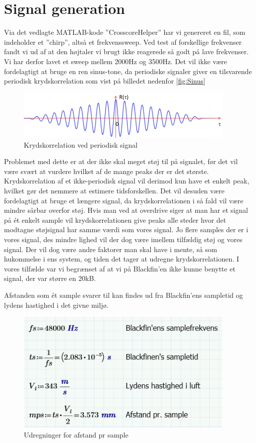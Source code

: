\graphicspath{{Chapters/Opgave1/}}

\chapter{Signal generation}
Via det vedlagte MATLAB-kode ”CrosscoreHelper” har vi genereret en fil, som indeholder et ”chirp”, altså et frekvenssweep. Ved test af forskellige frekvenser fandt vi ud af at den højtaler vi brugt ikke reagerede så godt på lave frekvenser. Vi har derfor lavet et sweep mellem 2000Hz og 3500Hz.
Det vil ikke være fordelagtigt at bruge en ren sinus-tone, da periodiske signaler giver en tilsvarende periodisk krydskorrelation som vist på billedet nedenfor \autoref{fig:Sinus}

\begin{figure}[H]
\centering
\includegraphics[width = 300pt]{Img/Sinus.PNG}
\caption{Krydskorrelation ved periodisk signal}
\label{fig:Sinus}
\end{figure}

Problemet med dette er at der ikke skal meget støj til på signalet, før det vil være svært at vurdere hvilket af de mange peaks der er det største. Krydskorrelation af et ikke-periodisk signal vil derimod kun have et enkelt peak, hvilket gør det nemmere at estimere tidsforskellen.
Det vil desuden være fordelagtigt at bruge et længere signal, da krydskorrelationen i så fald vil være mindre sårbar overfor støj. Hvis man ved at overdrive siger at man har et signal på ét enkelt sample vil krydskorrelationen give peaks alle steder hvor det modtagne støjsignal har samme værdi som vores signal. Jo flere samples der er i vores signal, des mindre lighed vil der dog være imellem tilfældig støj og vores signal. Der vil dog være andre faktorer man skal have i mente, så som hukommelse i ens system, og tiden det tager at udregne krydskorrelationen. I vores tilfælde var vi begrænset af at vi på Blackfin’en ikke kunne benytte et signal, der var større en 20kB.

Afstanden som ét sample svarer til kan findes ud fra Blackfin’ens sampletid og lydens hastighed i det givne miljø.

\begin{figure}[H]
\centering
\includegraphics[width = 300pt]{Img/UdregningSample.PNG}
\caption{Udregninger for afstand pr sample}
\label{fig:UdregningSample}
\end{figure}

